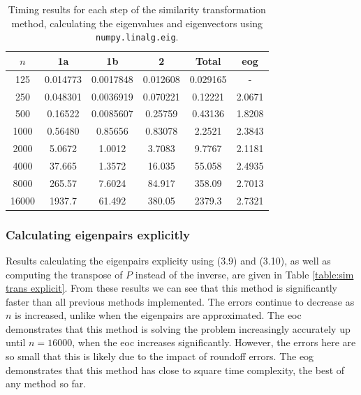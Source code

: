 \documentclass[11pt]{article}
\numberwithin{equation}{section}
\begin{document}
\begin{table}[H]
\centering
\begin{tabular}{|c|c|c|c|c|c|}
\hline
$n$ & 1a & 1b & 2 & Total & eog \\
\hline
125 & 0.014773 & 0.0017848 & 0.012608 & 0.029165 & - \\
250 & 0.048301 & 0.0036919 & 0.070221 & 0.12221 & 2.0671 \\
500 & 0.16522 & 0.0085607 &  0.25759 & 0.43136 & 1.8208 \\
1000 & 0.56480 & 0.85656 & 0.83078 & 2.2521 & 2.3843 \\
2000 & 5.0672 & 1.0012 & 3.7083 & 9.7767 & 2.1181 \\
4000 & 37.665 & 1.3572 & 16.035 & 55.058 & 2.4935 \\
8000 & 265.57 & 7.6024 & 84.917 & 358.09 & 2.7013 \\
16000 & 1937.7 & 61.492 & 380.05 & 2379.3 & 2.7321 \\
\hline
\end{tabular}
\captionsetup{justification=centering}
\caption{Timing results for each step of the similarity transformation method, calculating the eigenvalues and eigenvectors using \texttt{numpy.linalg.eig}.}
\label{table:sim trans numpy steps}
\end{table}

\subsubsection*{Calculating eigenpairs explicitly}
Results calculating the eigenpairs explicity using (3.9) and (3.10), as well as computing the transpose of $P$ instead of the inverse, are given in Table \ref{table:sim trans explicit}. From these results we can see that this method is significantly faster than all previous methods implemented. The errors continue to decrease as $n$ is increased, unlike when the eigenpairs are approximated. The eoc demonstrates that this method is solving the problem increasingly accurately up until $n=16000$, when the eoc increases significantly. However, the errors here are so small that this is likely due to the impact of roundoff errors. The eog demonstrates that this method has close to square time complexity, the best of any method so far.
\end{document}
